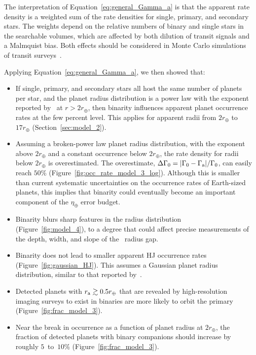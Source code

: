 \documentclass[12pt,modern]{aastex61}
\renewcommand{\a}{_{\rm a}}
\begin{document}
The interpretation of Equation~\ref{eq:general_Gamma_a} is that the
apparent rate density is a weighted sum of the rate densities for
single, primary, and secondary stars. The weights depend on the
relative numbers of binary and single stars in the searchable volumes,
which are affected by both dilution of transit signals and a Malmquist
bias.  Both effects should be considered in Monte Carlo simulations of
transit surveys~\citep[\textit{e.g.},][]{
  bakos_hatsouth:_2013,sullivan_transiting_2015, gunther_new_2017}.

Applying Equation~\ref{eq:general_Gamma_a}, we then showed that:
\begin{itemize}
%
\item If single, primary, and secondary stars all host the same number
  of planets per star, and the planet radius distribution is a power
    law with the exponent reported by~\citet{howard_planet_2012} at $r
    > 2r_\oplus$, then binarity influences apparent planet occurrence
    rates at the few percent level. This applies for apparent radii
    from $2r_\oplus$ to $17r_\oplus$ (Section~\ref{sec:model_2}).
%
\item Assuming a broken-power law planet radius distribution, with the
  \citet{howard_planet_2012} exponent above $2r_\oplus$ and a constant
    occurrence below $2r_\oplus$, the rate density for radii below
    $2r_\oplus$ is overestimated. The overestimate, $\Delta \Gamma_0 =
    |\Gamma_0 - \Gamma\a|/\Gamma_0$, can easily reach $50\%$
    (Figure~\ref{fig:occ_rate_model_3_log}).  Although this is smaller
    than current systematic uncertainties on the occurrence rates of
    Earth-sized planets, this implies that binarity could eventually
    become an important component of the $\eta_\oplus$ error budget.
%
\item Binarity blurs sharp features in the radius distribution
  (Figure~\ref{fig:model_4}), to a degree that could affect precise
    measurements of the depth, width, and slope of
    the~\citet{fulton_california-_2017} radius gap.
%
\item Binarity does not lead to smaller apparent HJ occurrence rates
  (Figure~\ref{fig:gaussian_HJ}).  This assumes a Gaussian planet
    radius distribution, similar to that reported
    by~\citet{petigura_CKS_2017}.
%
\item Detected planets with $r\a \gtrsim 0.5r_\oplus$ that are
  revealed by high-resolution imaging surveys to exist in binaries are
    more likely to orbit the primary (Figure~\ref{fig:frac_model_3}).
%
\item Near the break in occurrence as a function of planet
  radius at $2r_\oplus$, the fraction of detected planets with
    binary companions should increase by roughly $5$~to~$10\%$
    (Figure~\ref{fig:frac_model_3}).
\end{itemize}
\end{document}
